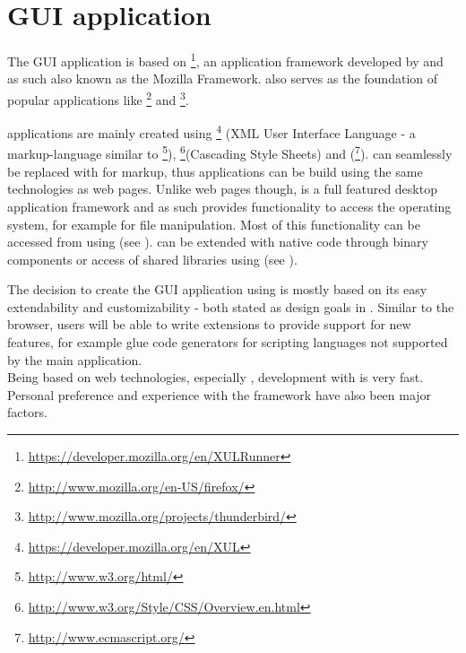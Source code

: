 \chapter{GUI application}
\label{chap:GUIApplication}

The GUI application is based on \footnote{\url{https://developer.mozilla.org/en/XULRunner}}, an application framework developed by  and as such also known as the Mozilla Framework.  also serves as the foundation of popular applications like \footnote{\url{http://www.mozilla.org/en-US/firefox/}} and \footnote{\url{http://www.mozilla.org/projects/thunderbird/}}. 

 applications are mainly created using \footnote{\url{https://developer.mozilla.org/en/XUL}} (XML User Interface Language - a markup-language similar to \footnote{\url{http://www.w3.org/html/}}), \footnote{\url{http://www.w3.org/Style/CSS/Overview.en.html}}(Cascading Style Sheets) and  (\footnote{\url{http://www.ecmascript.org/}}).  can seamlessly be replaced with  for markup, thus  applications can be build using the same technologies as web pages. Unlike web pages though,  is a full featured desktop application framework and as such provides functionality to access the operating system, for example for file manipulation. Most of this functionality can be accessed from  using  (see ).  can be extended with native code through  binary components or access of shared libraries using  (see ).

The decision to create the GUI application using  is mostly based on its easy extendability and customizability - both stated as design goals in . Similar to the  browser, users will be able to write extensions to provide support for new features, for example glue code generators for scripting languages not supported by the main application.\\
Being based on web technologies, especially , development with   is very fast.
\\Personal preference and experience with the framework have also been major factors.

